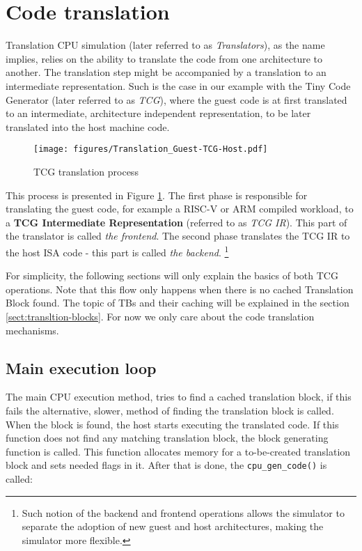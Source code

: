 \pagebreak
\section{Code translation}
\label{sect:code-translation}

Translation CPU simulation (later referred to as \textit{Translators}), as the name implies, relies on the ability to
translate the code from one architecture to another. The translation step might be accompanied by a translation to an
intermediate representation. Such is the case in our example with the Tiny Code Generator (later referred to as
\textit{TCG}), where the guest code is at first translated to an intermediate, architecture independent representation,
to be later translated into the host machine code.

\begin{figure}[h]
	\centering
	\vspace{10px}
	\texttt{[image: figures/Translation\_Guest-TCG-Host.pdf]}
	\caption{TCG translation process}
    \label{fig:tcg}
\end{figure}

\noindent
This process is presented in Figure \ref{fig:tcg}. The first phase is responsible for translating the guest code, for example a RISC-V or ARM compiled
workload, to a \textbf{TCG Intermediate Representation} (referred to as \textit{TCG IR}). This part of the translator is
called \textit{the frontend}. The second phase translates the TCG IR to the host ISA code - this part is called
\textit{the backend}.%
\footnote{Such notion of the backend and frontend operations allows the simulator to separate the adoption
of new guest and host architectures, making the simulator more flexible.}

For simplicity, the following sections will only explain the basics of both TCG operations.
Note that this flow only happens when there is no cached Translation Block found. The topic of TBs and
their caching will be explained in the section \ref{sect:transltion-blocks}. For now we only care about the code translation mechanisms.

\subsection{Main execution loop}
The main CPU execution method, tries to find a cached translation block, if this fails the alternative, slower, method of
finding the translation block is called. When the block is found, the host starts executing the translated code. 
If this function does not find any matching translation block, the block generating function is called.
This function allocates memory for a to-be-created translation block and sets needed flags in it. After that is done,
the \texttt{cpu\_gen\_code()} is called:

